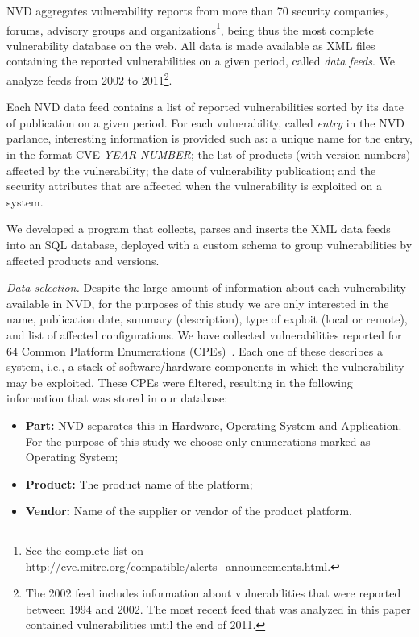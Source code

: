 NVD aggregates vulnerability reports from more than 70 security companies, forums, advisory groups and organizations\footnote{See the complete list on \url{http://cve.mitre.org/compatible/alerts_announcements.html}.}, being thus the most complete vulnerability database on the web.
All data is made available as XML files containing the reported vulnerabilities on a given period, called \emph{data feeds}.
We analyze feeds from 2002 to 2011\footnote{The 2002 feed includes information about vulnerabilities that were reported between 1994 and 2002. The most recent feed that was analyzed in this paper contained vulnerabilities until the end of  2011.}.



Each NVD data feed contains a list of reported vulnerabilities sorted by its date of publication on a given period.
For each vulnerability, called \emph{entry} in the NVD parlance, interesting information is provided such as: a unique name for the entry, in the format CVE-\textit{YEAR}-\textit{NUMBER}; the list of products (with version numbers) affected by the vulnerability; the date of vulnerability publication; and the security attributes that are affected when the vulnerability is exploited on a system.

We developed a program that collects, parses and inserts the XML data feeds into an SQL database, deployed with a custom schema to group vulnerabilities by affected products and versions.

\emph{Data selection. }
Despite the large amount of information about each vulnerability available in NVD, for the purposes of this study we are only interested in the name, publication date, summary  (description), type of exploit (local or remote), and list of affected configurations.
We have collected vulnerabilities reported for 64 Common Platform Enumerations (CPEs)~\cite{cpe}.
Each one of these describes a system, i.e., a stack of software/hardware components in which the vulnerability may be exploited.
These CPEs were filtered, resulting in the following information that was stored in our database:

\begin{itemize}

\item \textbf{Part:} NVD separates this in Hardware, Operating System and Application. For the purpose of this study we choose only enumerations marked as Operating System;

\item \textbf{Product:} The product name of the platform;

\item \textbf{Vendor:} Name of the supplier or vendor of the product platform.

\end{itemize}


